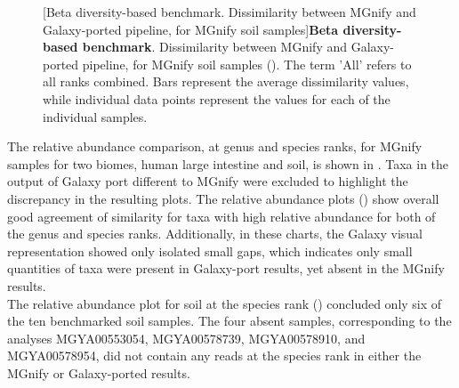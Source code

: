 \begin{figure}[H]
  \centering
  \hfill
  [Beta diversity-based benchmark. Dissimilarity between MGnify and Galaxy-ported pipeline, for MGnify soil samples]{\textbf{Beta diversity-based benchmark}. Dissimilarity between MGnify and Galaxy-ported pipeline, for MGnify soil samples (). The term 'All' refers to all ranks combined. Bars represent the average dissimilarity values, while individual data points represent the values for each of the individual samples.} \label{fig:mgnify_soil_beta_div}%
\end{figure}
The relative abundance comparison, at genus and species ranks, for MGnify samples for two biomes, human large intestine and soil, is shown in . Taxa in the output of Galaxy port different to MGnify were excluded to highlight the discrepancy in the resulting plots.
The relative abundance plots () show overall good agreement of similarity for taxa with high relative abundance for both of the genus and species ranks. Additionally, in these charts, the Galaxy visual representation showed only isolated small gaps, which indicates only small quantities of taxa were present in Galaxy-port results, yet absent in the MGnify results.\\
The relative abundance plot for soil at the species rank () concluded only six of the ten benchmarked soil samples. The four absent samples, corresponding to the analyses MGYA00553054, MGYA00578739, MGYA00578910, and MGYA00578954, did not contain any reads at the species rank in either the MGnify or Galaxy-ported results.\\

